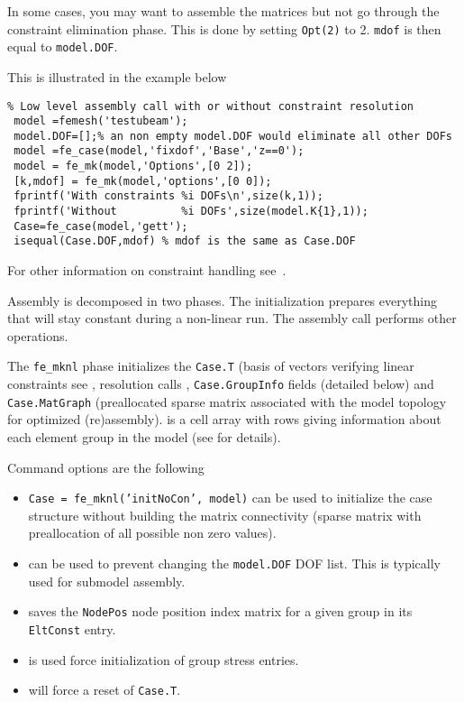 In some cases, you may want to assemble the matrices but not go through the constraint elimination phase. This is done by setting {\tt Opt(2)} to 2. {\tt mdof} is then equal to {\tt model.DOF}.

This is illustrated in the example below

\begin{verbatim}
% Low level assembly call with or without constraint resolution
 model =femesh('testubeam');
 model.DOF=[];% an non empty model.DOF would eliminate all other DOFs
 model =fe_case(model,'fixdof','Base','z==0');
 model = fe_mk(model,'Options',[0 2]); 
 [k,mdof] = fe_mk(model,'options',[0 0]); 
 fprintf('With constraints %i DOFs\n',size(k,1)); 
 fprintf('Without          %i DOFs',size(model.K{1},1));
 Case=fe_case(model,'gett');
 isequal(Case.DOF,mdof) % mdof is the same as Case.DOF
\end{verbatim}%


For other information on constraint handling see~.


Assembly is decomposed in two phases. The initialization prepares everything that will stay constant during a non-linear run. The assembly call performs other operations.


The {\tt fe\_mknl}  phase initializes the {\tt Case.T} (basis of vectors verifying linear constraints see , resolution calls , {\tt Case.GroupInfo} fields (detailed below) and {\tt Case.MatGraph} (preallocated sparse matrix associated with the model topology for optimized (re)assembly).  is a cell array with rows giving information about each element group in the model (see  for details). 

Command options are the following
\begin{itemize}
\item {} {\tt Case = fe\_mknl('initNoCon', model)} can be used to initialize the case structure without building the matrix connectivity (sparse matrix with preallocation of all possible non zero values).
\item  {} can be used to prevent changing the {\tt model.DOF} DOF list. This is typically used for submodel assembly.
\item  {} saves the {\tt NodePos} node position index matrix for a given group in its {\tt EltConst} entry. 
\item  {} is used force initialization of group stress entries.
\item  {} will force a reset of {\tt Case.T}.

\end{itemize}

